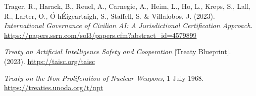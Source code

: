 \documentclass[12pt,a4paper]{article}
\begin{document}
Trager, R., Harack, B., Reuel, A., Carnegie, A., Heim, L., Ho, L., Kreps, S., Lall, R., Larter, O., Ó hÉigeartaigh, S., Staffell, S. \& Villalobos, J. (2023). \textit{International Governance of Civilian AI: A Jurisdictional Certification Approach}. \url{https://papers.ssrn.com/sol3/papers.cfm?abstract_id=4579899}

\textit{Treaty on Artificial Intelligence Safety and Cooperation} [Treaty Blueprint]. (2023). \url{https://taisc.org/taisc}

\textit{Treaty on the Non-Proliferation of Nuclear Weapons}, 1 July 1968. \url{https://treaties.unoda.org/t/npt}
\end{document}
